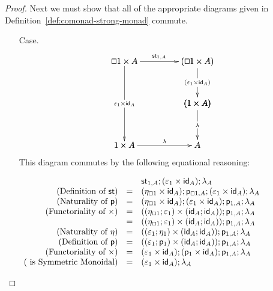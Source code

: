 \documentclass{article}
\let\Diamond\relax
\renewcommand{\Box}{\oblong}
\newcommand{\st}[2]{\mathsf{st}_{#1,#2}}
\newcommand{\id}[0]{\mathsf{id}}
\newcommand{\p}[1]{\mathsf{p}_{#1}}
\begin{document}
\begin{proof}
  Next we must show that all of the appropriate diagrams given in
  Definition~\ref{def:comonad-strong-monad} commute.
  \begin{itemize}
  \item[Case.] \ \\
    $$
    \bfig
    \vSquares|ammmmma|/>``>```>`>/[\Box 1 \times \Diamond A`\Diamond (\Box 1 \times A)``\Diamond(1 \times A)`1 \times \Diamond A`\Diamond A;\st{1}{A}``\Diamond(\varepsilon_1 \times \id_A)```\Diamond\lambda`\lambda]
    \morphism(0,1000)|m|/->/<0,-950>[`;\varepsilon_1 \times \id_{\Diamond A}]
    \efig
    $$
    This diagram commutes by the following equational reasoning:
    \begin{center}
      \begin{math}
        \begin{array}{rllllllll}
          & & \st{1}{A};\Diamond (\varepsilon_1 \times \id_A);\Diamond\lambda_A\\
          \text{(Definition of $\mathsf{st}$)}
          & = & (\eta_{\Box 1} \times \id_{\Diamond A});\p{\Box 1,\Diamond A};\Diamond (\varepsilon_1 \times \id_A);\Diamond\lambda_A\\
          \text{(Naturality of $\mathsf{p}$)}
          & = & (\eta_{\Box 1} \times \id_{\Diamond A});(\Diamond \varepsilon_1 \times \Diamond\id_A);\p{1,A};\Diamond\lambda_A\\
          \text{(Functoriality of $\times$)}
          & = & ((\eta_{\Box 1};\Diamond \varepsilon_1) \times (\id_{\Diamond A};\Diamond\id_A));\p{1,A};\Diamond\lambda_A\\
          & = & ((\eta_{\Box 1};\Diamond \varepsilon_1) \times (\id_{\Diamond A};\id_{\Diamond A}));\p{1,A};\Diamond\lambda_A\\
          \text{(Naturality of $\eta$)}
          & = & ((\varepsilon_1;\eta_{1}) \times (\id_{\Diamond A};\id_{\Diamond A}));\p{1,A};\Diamond\lambda_A\\
          \text{(Definition of $\mathsf{p}$)}
          & = & ((\varepsilon_1;\p{1}) \times (\id_{\Diamond A};\id_{\Diamond A}));\p{1,A};\Diamond\lambda_A\\
          \text{(Functoriality of $\times$)}
          & = & (\varepsilon_1 \times \id_{\Diamond A});(\p{1} \times \id_{\Diamond A});\p{1,A};\Diamond\lambda_A\\
          \text{($\Diamond$ is Symmetric Monoidal)}
          & = & (\varepsilon_1 \times \id_{\Diamond A});\lambda_{\Diamond A}\\
        \end{array}
      \end{math}
    \end{center}
    

\end{itemize}
\end{proof}
\end{document}
